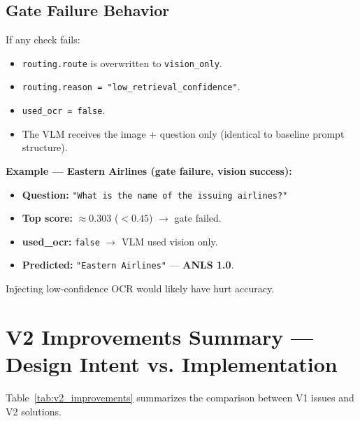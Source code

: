 \documentclass[11pt,a4paper]{article}
\begin{document}
\subsection{Gate Failure Behavior}
If any check fails:
\begin{itemize}
    \item \texttt{routing.route} is overwritten to \texttt{vision\_only}.
    \item \texttt{routing.reason = "low\_retrieval\_confidence"}.
    \item \texttt{used\_ocr = false}.
    \item The VLM receives the image + question only (identical to baseline prompt structure).
\end{itemize}

\noindent\textbf{Example --- Eastern Airlines (gate failure, vision success):}
\begin{itemize}
    \item \textbf{Question:} \texttt{"What is the name of the issuing airlines?"}
    \item \textbf{Top score:} $\approx 0.303$ ($< 0.45$) $\rightarrow$ gate failed.
    \item \textbf{used\_ocr:} \texttt{false} $\rightarrow$ VLM used vision only.
    \item \textbf{Predicted:} \texttt{"Eastern Airlines"} --- \textbf{ANLS 1.0}.
\end{itemize}
Injecting low-confidence OCR would likely have hurt accuracy.

\newpage
\section{V2 Improvements Summary --- Design Intent vs. Implementation}
Table~\ref{tab:v2_improvements} summarizes the comparison between V1 issues and V2 solutions.
\end{document}
